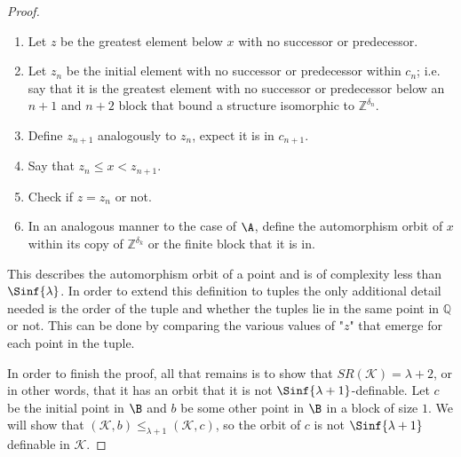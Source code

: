 \documentclass{amsart}
\newcommand{\SR}{SR}
\newcommand{\Q}{\mathbb{Q}}
\newcommand{\Z}{\mathbb{Z}}
\newcommand{\K}{\mathcal{K}}
\begin{document}
\begin{proof}
\begin{enumerate}
    \item Let $z$ be the greatest element below $x$ with no successor or predecessor.

    \item Let $z_n$ be the initial element with no successor or predecessor
        within $c_n$; i.e. say that it is the greatest element with no successor
        or predecessor below an $n+1$ and $n+2$ block that bound a structure
        isomorphic to $\Z^{\delta_n}$.

    \item Define $z_{n+1}$ analogously to $z_n$, expect it is in $c_{n+1}.$
    \item Say that $z_n\leq x<z_{n+1}$.
    \item Check if $z=z_n$ or not.

    \item In an analogous manner to the case of $\A$, define the automorphism
        orbit of $x$ within its copy of $\Z^{\delta_k}$ or the finite
        block that it is in.

\end{enumerate}

This describes the automorphism orbit of a point and is of complexity less than
$\Sinf{\lambda}$. In order to extend this definition to tuples the only
additional detail needed is the order of the tuple and whether the tuples lie in the same point in $\Q$ or not. This can be done by comparing the various values of "$z$" that emerge for each point in the tuple.

In order to finish the proof, all that remains is to show that
$\SR(\K)=\lambda+2$, or in other words, that it has an orbit that it is not
$\Sinf{\lambda+1}$-definable. Let $c$ be the initial point in $\B$ and $b$ be
some other point in $\B$ in a block of size $1$. We will show that 
$(\K,b)\leq_{\lambda+1}(\K,c)$, so the orbit of $c$ is not $\Sinf{\lambda+1}$
definable in $\K$.


\end{proof}
\end{document}
